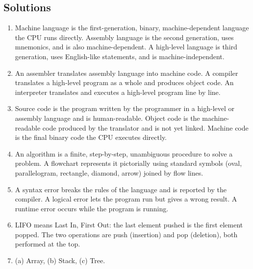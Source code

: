 \documentclass[11pt]{article}
\begin{document}
\subsection*{Solutions}
\begingroup\small
\begin{enumerate}[label=\arabic*.]
  \item Machine language is the first-generation, binary, machine-dependent
    language the CPU runs directly. Assembly language is the second
    generation, uses mnemonics, and is also machine-dependent. A high-level
    language is third generation, uses English-like statements, and is
    machine-independent.
  \item An assembler translates assembly language into machine code. A
    compiler translates a high-level program as a whole and produces object
    code. An interpreter translates and executes a high-level program line by
    line.
  \item Source code is the program written by the programmer in a high-level
    or assembly language and is human-readable. Object code is the
    machine-readable code produced by the translator and is not yet linked.
    Machine code is the final binary code the CPU executes directly.
  \item An algorithm is a finite, step-by-step, unambiguous procedure to solve
    a problem. A flowchart represents it pictorially using standard symbols
    (oval, parallelogram, rectangle, diamond, arrow) joined by flow lines.
  \item A syntax error breaks the rules of the language and is reported by
    the compiler. A logical error lets the program run but gives a wrong
    result. A runtime error occurs while the program is running.
  \item LIFO means Last In, First Out: the last element pushed is the first
    element popped. The two operations are push (insertion) and pop
    (deletion), both performed at the top.
  \item (a) Array, (b) Stack, (c) Tree.
\end{enumerate}
\endgroup
\end{document}
